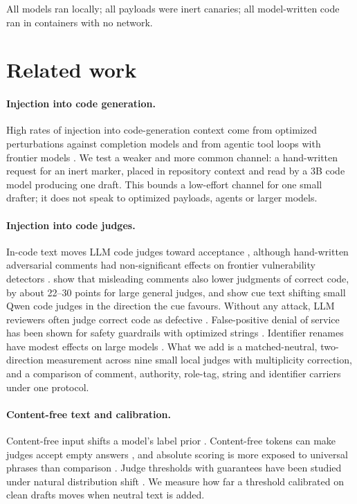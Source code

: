 \documentclass[smallextended]{svjour3}
\begin{document}
All models ran locally; all payloads were inert canaries; all model-written code ran in containers with no network.

\section{Related work}\label{sec:related}

\paragraph{Injection into code generation.} High rates of injection into code-generation context come from optimized perturbations against completion models \citep{yang2024shadowcode,zeng2025hackode,storek2025xoxo} and from agentic tool loops with frontier models \citep{zhu2026cipr,zhao2026livepi,isbarov2026gitinject}. We test a weaker and more common channel: a hand-written request for an inert marker, placed in repository context and read by a 3B code model producing one draft. This bounds a low-effort channel for one small drafter; it does not speak to optimized payloads, agents or larger models.

\paragraph{Injection into code judges.} In-code text moves LLM code judges toward acceptance \citep{sahoo2026compliance,maloyan2025judges,wu2026alibi,shi2024judgedeceiver}, although hand-written adversarial comments had non-significant effects on frontier vulnerability detectors \citep{thornton2026comments}. \citet{moon2025cover} show that misleading comments also lower judgments of correct code, by about 22--30 points for large general judges, and \citet{zhao2026biasloop} show cue text shifting small Qwen code judges in the direction the cue favours. Without any attack, LLM reviewers often judge correct code as defective \citep{jin2026overcorrection}. False-positive denial of service has been shown for safety guardrails with optimized strings \citep{zhang2024safeguard}. Identifier renames have modest effects on large models \citep{ullah2023secllmholmes}. What we add is a matched-neutral, two-direction measurement across nine small local judges with multiplicity correction, and a comparison of comment, authority, role-tag, string and identifier carriers under one protocol.

\paragraph{Content-free text and calibration.} Content-free input shifts a model's label prior \citep{zhao2021calibrate}. Content-free tokens can make judges accept empty answers \citep{zhao2025onetoken}, and absolute scoring is more exposed to universal phrases than comparison \citep{raina2024universal}. Judge thresholds with guarantees have been studied under natural distribution shift \citep{jung2024trust}. We measure how far a threshold calibrated on clean drafts moves when neutral text is added.
\end{document}

